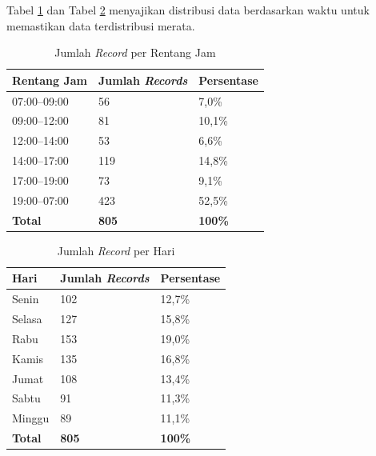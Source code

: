 Tabel \ref{tab:distribusi-jam} dan Tabel \ref{tab:distribusi-hari} menyajikan distribusi data berdasarkan waktu untuk memastikan data terdistribusi merata.

\begin{table}[H]
  \caption{Jumlah \textit{Record} per Rentang Jam}
  \label{tab:distribusi-jam}
  \centering
  \begin{tabular}{| l | l | l |}
    \hline
    \textbf{Rentang Jam} & \textbf{Jumlah \textit{Records}} & \textbf{Persentase} \\
    \hline
    07:00--09:00        & 56  & 7,0\%  \\
    \hline
    09:00--12:00        & 81  & 10,1\% \\
    \hline
    12:00--14:00        & 53  & 6,6\%  \\
    \hline
    14:00--17:00        & 119 & 14,8\% \\
    \hline
    17:00--19:00        & 73  & 9,1\%  \\
    \hline
    19:00--07:00        & 423 & 52,5\% \\
    \hline
    \textbf{Total}      & \textbf{805} & \textbf{100\%} \\
    \hline
  \end{tabular}
\end{table}

\begin{table}[H]
  \caption{Jumlah \textit{Record} per Hari}
  \label{tab:distribusi-hari}
  \centering
  \begin{tabular}{| l | l | l |}
    \hline
    \textbf{Hari} & \textbf{Jumlah \textit{Records}} & \textbf{Persentase} \\
    \hline
    Senin         & 102 & 12,7\% \\
    \hline
    Selasa        & 127 & 15,8\% \\
    \hline
    Rabu          & 153 & 19,0\% \\
    \hline
    Kamis         & 135 & 16,8\% \\
    \hline
    Jumat         & 108 & 13,4\% \\
    \hline
    Sabtu         & 91  & 11,3\% \\
    \hline
    Minggu        & 89  & 11,1\% \\
    \hline
    \textbf{Total} & \textbf{805} & \textbf{100\%} \\
    \hline
  \end{tabular}
\end{table}

